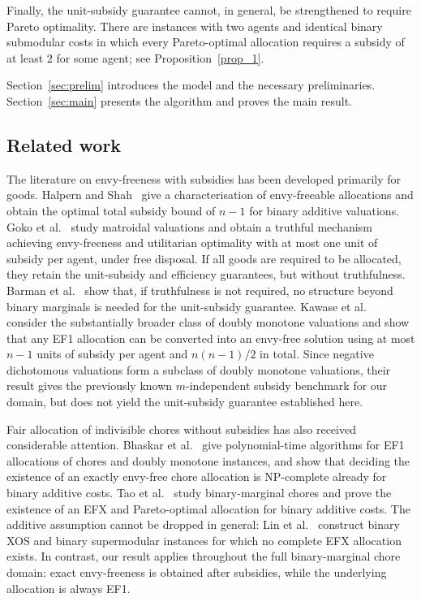 \documentclass[sigconf,anonymous]{aamas}
\theoremstyle{acmplain}
\theoremstyle{acmdefinition}
\theoremstyle{acmplain}
\begin{document}
Finally, the unit-subsidy guarantee cannot, in general, be strengthened to require Pareto optimality. There are instances with two agents and identical binary submodular costs in which every Pareto-optimal allocation requires a subsidy of at least $2$ for some agent; see Proposition~\ref{prop_1}.

Section~\ref{sec:prelim} introduces the model and the necessary preliminaries. Section~\ref{sec:main} presents the algorithm and proves the main result.


\subsection{Related work}

The literature on envy-freeness with subsidies has been developed primarily for goods. Halpern and Shah~\cite{HS19} give a characterisation of envy-freeable allocations and obtain the optimal total subsidy bound of $n-1$ for binary additive valuations. Goko et al.~\cite{goko2024fair} study matroidal valuations and obtain a truthful mechanism achieving envy-freeness and utilitarian optimality with at most one unit of subsidy per agent, under free disposal. If all goods are required to be allocated, they retain the unit-subsidy and efficiency guarantees, but without truthfulness. Barman et al.~\cite{BKNS22} show that, if truthfulness is not required, no structure beyond binary marginals is needed for the unit-subsidy guarantee. Kawase et al.~\cite{kawase2025towards} consider the substantially broader class of doubly monotone valuations and show that any EF1 allocation can be converted into an envy-free solution using at most $n-1$ units of subsidy per agent and $n(n-1)/2$ in total. Since negative dichotomous valuations form a subclass of doubly monotone valuations, their result gives the previously known $m$-independent subsidy benchmark for our domain, but does not yield the unit-subsidy guarantee established here.




Fair allocation of indivisible chores without subsidies has also received considerable attention. Bhaskar et al.~\cite{BSV21} give polynomial-time algorithms for EF1 allocations of chores and doubly monotone instances, and show that deciding the existence of an exactly envy-free chore allocation is NP-complete already for binary additive costs. Tao et al.~\cite{tao2025existence} study binary-marginal chores and prove the existence of an EFX and Pareto-optimal allocation for binary additive costs. The additive assumption cannot be dropped in general: Lin et al.~\cite{LLTZ26} construct binary XOS and binary supermodular instances for which no complete EFX allocation exists. In contrast, our result applies throughout the full binary-marginal chore domain: exact envy-freeness is obtained after subsidies, while the underlying allocation is always EF1.
\end{document}
